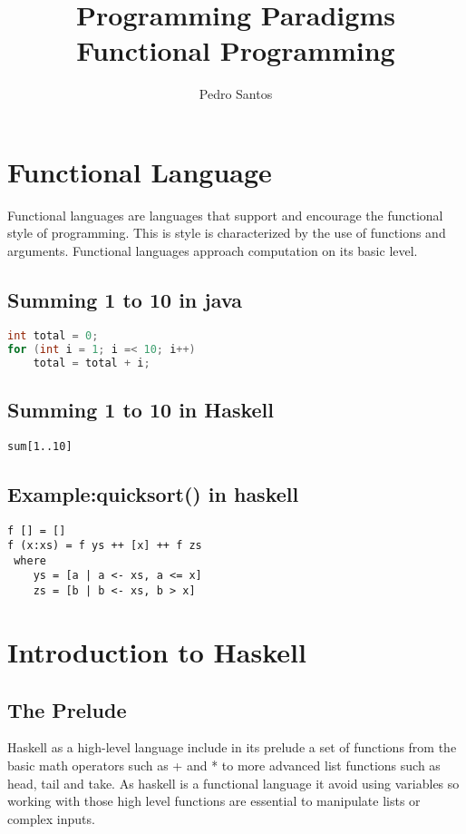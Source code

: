 \documentclass[12pt, oneside]{article}
\title{Programming Paradigms \\ Functional Programming}
\author{Pedro Santos}
\begin{document}
\maketitle
\newpage
\tableofcontents
\section{Functional Language}
Functional languages are languages that support and encourage the functional style of programming. This is style is characterized by the use of functions and arguments. Functional languages approach computation on its basic level. 
\subsection{Summing 1 to 10 in java}
\begin{lstlisting}[language=java]
int total = 0;
for (int i = 1; i =< 10; i++)
	total = total + i; 
\end{lstlisting}
\subsection{Summing 1 to 10 in Haskell}
\begin{lstlisting}
sum[1..10]
\end{lstlisting}
\subsection{Example:quicksort() in haskell}
\begin{lstlisting}
f [] = []
f (x:xs) = f ys ++ [x] ++ f zs
 where
    ys = [a | a <- xs, a <= x]
    zs = [b | b <- xs, b > x] 
\end{lstlisting}

\section{Introduction to Haskell}
\subsection{The Prelude}
Haskell as a high-level language include in its prelude a set of functions from the basic math operators such as + and * to more advanced list functions such as head, tail and take. As haskell is a functional language it avoid using variables so working with those high level functions are essential to manipulate lists or complex inputs.
\end{document}

